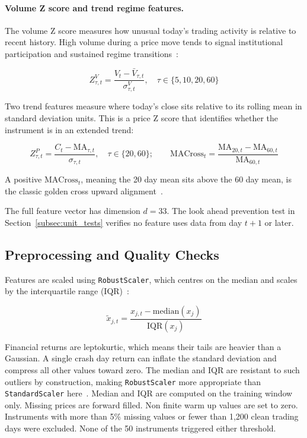 \paragraph{Volume Z score and trend regime features.}
The volume Z score measures how unusual today's trading activity is relative to recent history. High volume during a price move tends to signal institutional participation and sustained regime transitions~\cite{brock1992}:

\begin{equation}
  Z^{V}_{\tau,t} = \frac{V_t - \bar{V}_{\tau,t}}{\sigma^{V}_{\tau,t}},
  \quad \tau \in \{5, 10, 20, 60\}
  \label{eq:vol_zscore}
\end{equation}

Two trend features measure where today's close sits relative to its rolling mean in standard deviation units. This is a price Z score that identifies whether the instrument is in an extended trend:

\begin{equation}
  Z^{P}_{\tau,t} = \frac{C_t - \text{MA}_{\tau,t}}{\sigma_{\tau,t}},
  \quad \tau \in \{20, 60\}; \qquad
  \text{MACross}_t = \frac{\text{MA}_{20,t} - \text{MA}_{60,t}}{\text{MA}_{60,t}}
  \label{eq:price_zscore}
\end{equation}

A positive $\text{MACross}_t$, meaning the 20 day mean sits above the 60 day mean, is the classic golden cross upward alignment~\cite{brock1992}.

The full feature vector has dimension $d{=}33$. The look ahead prevention test in Section~\ref{subsec:unit_tests} verifies no feature uses data from day $t{+}1$ or later.

\subsection{Preprocessing and Quality Checks}

Features are scaled using \texttt{RobustScaler}, which centres on the median and scales by the interquartile range (IQR)~\cite{huber1981,rousseeuw1993}:

\begin{equation}
  \tilde{x}_{j,t} = \frac{x_{j,t} - \text{median}(x_j)}{\text{IQR}(x_j)}
  \label{eq:robust_scaler}
\end{equation}

Financial returns are leptokurtic, which means their tails are heavier than a Gaussian. A single crash day return can inflate the standard deviation and compress all other values toward zero. The median and IQR are resistant to such outliers by construction, making \texttt{RobustScaler} more appropriate than \texttt{StandardScaler} here~\cite{engle1982,bollerslev1986}. Median and IQR are computed on the training window only. Missing prices are forward filled. Non finite warm up values are set to zero. Instruments with more than 5\% missing values or fewer than 1,200 clean trading days were excluded. None of the 50 instruments triggered either threshold.

